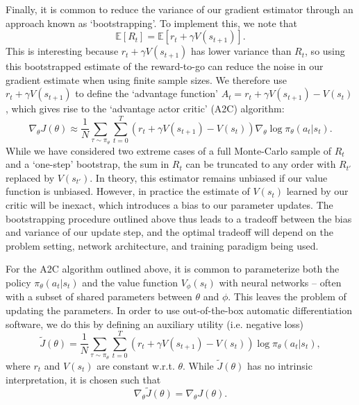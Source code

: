 Finally, it is common to reduce the variance of our gradient estimator through an approach known as `bootstrapping'.
To implement this, we note that
\begin{equation}
    \mathbb{E} \left [ R_t \right ] = \mathbb{E}[r_t + \gamma V(s_{t+1})].
\end{equation}
This is interesting because $r_t + \gamma V(s_{t+1})$ has lower variance than $R_t$, so using this bootstrapped estimate of the reward-to-go can reduce the noise in our gradient estimate when using finite sample sizes.
We therefore use $r_t + \gamma V(s_{t+1})$ to define the `advantage function' $A_t = r_t + \gamma V(s_{t+1}) - V(s_t)$, which gives rise to the `advantage actor critic' (A2C) algorithm:
\begin{equation}
    \nabla_\theta J(\theta) \approx \frac{1}{N} \sum_{\tau \sim \pi_\theta}  \sum_{t=0}^T (r_t + \gamma V(s_{t+1}) - V(s_t)) \nabla_\theta \log \pi_\theta (a_t|s_t).
\end{equation}
While we have considered two extreme cases of a full Monte-Carlo sample of $R_t$ and a `one-step' bootstrap, the sum in $R_t$ can be truncated to any order with $R_{t'}$ replaced by $V(s_{t'})$.
In theory, this estimator remains unbiased if our value function is unbiased.
However, in practice the estimate of $V(s_t)$ learned by our critic will be inexact, which introduces a bias to our parameter updates.
The bootstrapping procedure outlined above thus leads to a tradeoff between the bias and variance of our update step, and the optimal tradeoff will depend on the problem setting, network architecture, and training paradigm being used.

For the A2C algorithm outlined above, it is common to parameterize both the policy $\pi_\theta(a_t|s_t)$ and the value function $V_\phi(s_t)$ with neural networks -- often with a subset of shared parameters between $\theta$ and $\phi$.
This leaves the problem of updating the parameters.
In order to use out-of-the-box automatic differentiation software, we do this by defining an auxiliary utility (i.e. negative loss)
\begin{equation}
    \tilde{J}(\theta) = \frac{1}{N} \sum_{\tau \sim \pi_\theta}  \sum_{t=0}^T (r_t + \gamma V(s_{t+1}) - V(s_t)) \log \pi_\theta (a_t|s_t),
\end{equation}
where $r_t$ and $V(s_t)$ are constant w.r.t. $\theta$.
While $\tilde{J}(\theta)$ has no intrinsic interpretation, it is chosen such that
\begin{equation}
    \nabla_\theta \tilde{J}(\theta) = \nabla_\theta J(\theta).
\end{equation}

